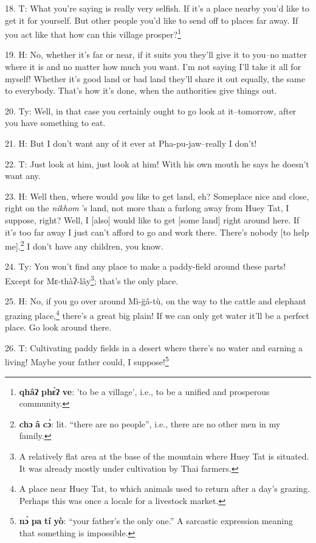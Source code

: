 18. T: What you're saying is really very selfish. If it's a place nearby you'd
like to get it for yourself. But other people you'd like to send off to places
far away. If you act like that how can this village prosper?\footnote{\textbf{qhâʔ} \textbf{phɛ̀ʔ} \textbf{ve}: 'to be a village', i.e., to be a unified and prosperous community.}

19. H: No, whether it's far or near, if it suits you they'll give it to you--no
matter where it is and no matter how much you want. I'm not saying I'll take it
all for myself! Whether it's good land or bad land they'll share it out equally,
the same to everybody. That's how it's done, when the authorities give things out.

20. Ty: Well, in that case you certainly ought to go look at it--tomorrow,
after you have something to eat.

21. H: But I don't want any of it ever at Pha-pu-jaw--really I don't!

22. T: Just look at him, just look at him! With his own mouth he says he doesn't
want any.

23. H: Well then, where would \textit{you } like to get land, eh? Someplace nice
and close, right on the \textit{nikhom }'s land, not more than a furlong away
from Huey Tat, I suppose, right? Well, I [also] would like to get [some land] right
around here. If it's too far away I just can't afford to go and work there. There's
nobody [to help me].\footnote{\textbf{chɔ} \textbf{â} \textbf{cɔ̀}: lit. ``there are no people'', i.e., there are no other men in my family.} I don't have any children, you know.

24. Ty: You won't find any place to make a paddy-field around these parts!
Except for Mɛ-thàʔ-lây\footnote{A relatively flat area at the base of the mountain where Huey Tat is situated. It was already mostly under cultivation by Thai farmers.}; that's the only place.

25. H: No, if you go over around Mì-g̈â-tù, on the way to the cattle and elephant
grazing place,\footnote{A place near Huey Tat, to which animals used to return after a day's grazing. Perhaps this was once a locale for a livestock market.} there's a great big plain! If we can only get water it'll be
a perfect place. Go look around there.

26. T: Cultivating paddy fields in a desert where there's no water and earning
a living! Maybe your father could, I suppose!\footnote{\textbf{nɔ̀} \textbf{pa} \textbf{tí} \textbf{yò}: ``your father's the only one.'' A sarcastic expression meaning that something is impossible.}

